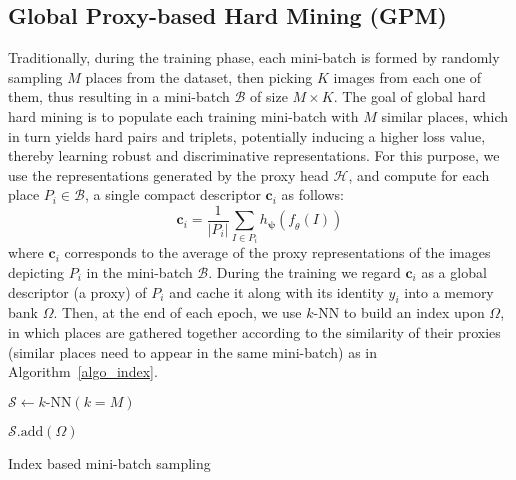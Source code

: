 \documentclass{bmvc2k}
\begin{document}
\subsection{Global Proxy-based Hard Mining (GPM)}\label{ssec:gpm}
Traditionally, during the training phase, each mini-batch is formed by randomly sampling $M$ places from the dataset, then picking $K$ images from each one of them, thus resulting in a mini-batch $\mathcal{B}$ of size $M \times K$.
The goal of global hard hard mining is to populate each training mini-batch with $M$ similar places, which in turn yields hard pairs and triplets, potentially inducing a higher loss value, thereby learning robust and discriminative representations. For this purpose, we use the representations generated by the proxy head $\mathcal{H}$, and compute for each place $P_i \in \mathcal{B}$, a single compact descriptor $\mathbf{c}_i$ as follows:
\begin{equation}
    \mathbf{c}_i = \frac{1}{|P_i|} \sum_{I \in P_i} \mathit{h_{\mathbf{\psi}}} \left(   \mathit{f_{\theta}}\left(I\right) \right) 
\end{equation}
where $\mathbf{c}_i$ corresponds to the average of the proxy representations of the images depicting $P_i$ in the mini-batch $\mathcal{B}$. During the training we regard $\mathbf{c}_i$ as a global descriptor (a proxy) of $P_i$ and cache it along with its identity $y_i$ into a memory bank $\Omega$. Then, at the end of each epoch, we use $k$-NN to build an index upon $\Omega$, in which places are gathered together according to the similarity of their proxies (similar places need to appear in the same mini-batch) as in Algorithm~\ref{algo_index}.

\begin{algorithm}
\BlankLine
\nl $\mathcal{S} \leftarrow k\text{-NN}(k=M)$ 

\nl $\mathcal{S}\text{.add}(\Omega)$ 

\caption{Index based mini-batch sampling}\label{algo_index}
\end{algorithm}
\end{document}
